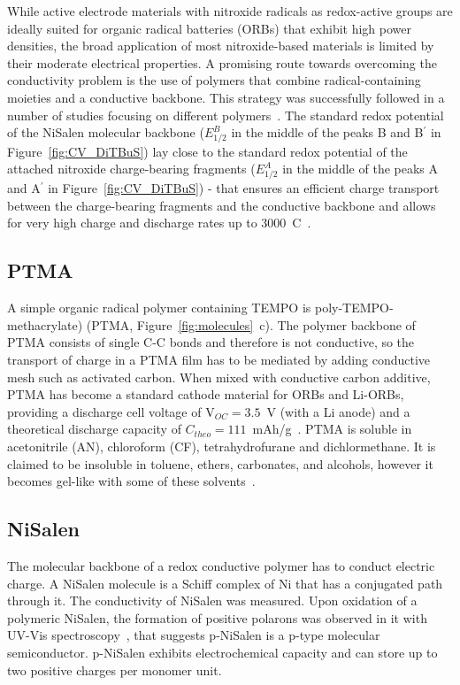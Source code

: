\par
While active electrode materials with nitroxide radicals as redox-active groups are ideally suited for organic radical batteries (ORBs) that exhibit high power densities, the broad application of most nitroxide-based materials is limited by their moderate electrical properties. A promising route towards overcoming the conductivity problem is the use of polymers that combine radical-containing moieties and a conductive backbone. This strategy was successfully followed in a number of studies focusing on different polymers~\cite{oyaizu2015_polymerjournal, bahaceci2013_jpowersources, katsumata2006_mrc, xu2014_electact, aydin2015_jsoistatelect, schwartz2018_synthmet}. The standard redox potential of the NiSalen molecular backbone ($E_{1/2}^B$ in the middle of the peaks B and B$^\prime$ in Figure~\ref{fig:CV_DiTBuS}) lay close to the standard redox potential of the attached nitroxide charge-bearing fragments ($E_{1/2}^A$ in the middle of the peaks A and A$^\prime$ in Figure~\ref{fig:CV_DiTBuS}) - that ensures an efficient charge transport between the charge-bearing fragments and the conductive backbone and allows for very high charge and discharge rates up to 3000~C~\cite{Vereshchagin2020,Kulikov2022}.

\subsection{PTMA}
A simple organic radical polymer containing TEMPO is poly-TEMPO-methacrylate) (PTMA, Figure~\ref{fig:molecules}~c). The polymer backbone of PTMA consists of single C-C bonds and therefore is not conductive, so the transport of charge in a PTMA film has to be mediated by adding conductive mesh such as activated carbon. When mixed with conductive carbon additive, PTMA has become a standard cathode material for ORBs and Li-ORBs, providing a discharge cell voltage of V$_{OC}=3.5$~V (with a Li anode) and a theoretical discharge capacity of $C_{theo}=111$~mAh/g~\cite{Daniel2023_Multimodal}. PTMA is soluble in acetonitrile (AN), chloroform (CF), tetrahydrofurane and dichlormethane. It is claimed to be insoluble in toluene, ethers, carbonates, and alcohols, however it becomes gel-like with some of these solvents~\cite{DOM}.

\subsection{NiSalen}
The molecular backbone of a redox conductive polymer has to conduct electric charge. A NiSalen molecule is a Schiff complex of Ni that has a conjugated path through it. The conductivity of NiSalen was measured. Upon oxidation of a polymeric NiSalen, the formation of positive polarons was observed in it with UV-Vis spectroscopy~\cite{Dmitrieva2018}, that suggests p-NiSalen is a p-type molecular semiconductor. p-NiSalen exhibits electrochemical capacity and can store up to two positive charges per monomer unit.


